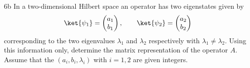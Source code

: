 \documentclass[12pt]{article}
\begin{document}
\begin{exc}{6b}
In a two-dimensional Hilbert space an operator has two eigenstates
given by
\begin{equation}
    \ket{\psi_1} = \begin{pmatrix}
        a_1\\b_1 
    \end{pmatrix},\qquad \ket{\psi_2} = \begin{pmatrix}
        a_2 \\ b_2
    \end{pmatrix}
\end{equation}
    corresponding to the two eigenvalues $\lambda_1$ and $\lambda_2$ respectively with $\lambda_1 \neq \lambda_2$. Using this information only, determine the matrix representation of the operator $A$. Assume that the $(a_i, b_i,\lambda_i)$ with $i = 1,2$ are given integers.
\end{exc}
\end{document}
